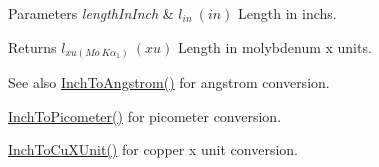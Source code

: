 \begin{DoxyParams}{Parameters}
{\em length\+In\+Inch} & $ l_{in}\ (in)$ Length in inchs. \\
\hline
\end{DoxyParams}
\begin{DoxyReturn}{Returns}
$ l_{xu(Mo\ K\alpha_1)}\ (xu)$ Length in molybdenum x units. 
\end{DoxyReturn}
\begin{DoxySeeAlso}{See also}
\mbox{\hyperlink{group___e_g_x_math-_conversions-_length_conversions-_imperial-_inch-_non-_s_i_ga37c2030e31292fe77b024bffaf4c7f9b}{Inch\+To\+Angstrom()}} for angstrom conversion. 

\mbox{\hyperlink{group___e_g_x_math-_conversions-_length_conversions-_imperial-_inch-_s_i_ga4220728877d0369e359689a0d8f8207c}{Inch\+To\+Picometer()}} for picometer conversion. 

\mbox{\hyperlink{group___e_g_x_math-_conversions-_length_conversions-_imperial-_inch-_non-_s_i_ga90455aa8e1aaf26567c2b11fc24730c9}{Inch\+To\+Cu\+X\+Unit()}} for copper x unit conversion. 
\end{DoxySeeAlso}
